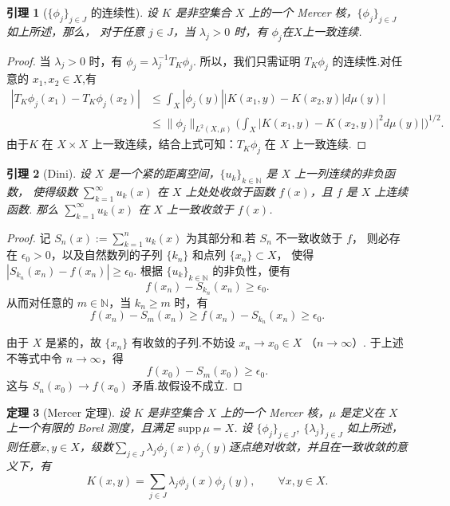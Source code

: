 \documentclass[12pt, a4paper, oneside]{ctexbook}
\newtheorem{theorem}{定理}[section]
\newtheorem{lemma}[theorem]{引理}
\begin{document}
\begin{lemma}[{\(\{\phi_j\}_{j\in J}\) 的连续性}]\label{lemma: phi_j连续性}
设 $K$ 是非空集合 $X$ 上的一个 Mercer 核，$\{\phi_j\}_{j\in J}$ 如上所述，那么，
对于任意 $j\in J$，当 $\lambda_j>0$ 时，有 $\phi_j$在$X$上一致连续.
\end{lemma}

\begin{proof}
    当  $\lambda _{j}> 0$ 时，有 $\phi_j=\lambda_j^{-1}T_{K}\phi_{j}.$ 所以，我们只需证明 $T_K\phi_{j}$ 的连续性.对任意的 $x_1,x_2\in X$,有
$$\begin{aligned}|T_{K}\phi_{j}(x_{1})-T_{K}\phi_{j}(x_{2})|&\leq\int_{X}|\phi_{j}(y)||K(x_{1},y)-K(x_{2},y)|d\mu(y)|\\&\leq\|\phi_j\|_{L^2(X,\mu)}\Big(\int_X|K(x_1,y)-K(x_2,y)|^2d\mu(y)|\Big)^{1/2}.\end{aligned}$$
由于$K$ 在 $X\times X$ 上一致连续，结合上式可知：$T_K\phi_j$ 在 $X$ 上一致连续.
\end{proof}

\begin{lemma}[Dini]\label{lemma:Dini}
设 $X$ 是一个紧的距离空间，$\{u_k\}_{k\in\mathbb{N}}$ 是 $X$ 上一列连续的非负函数，
使得级数 $\sum_{k=1}^\infty u_k(x)$ 在 $X$ 上处处收敛于函数 $f(x)$，且 $f$ 是 $X$ 上连续函数.
那么 $\sum_{k=1}^\infty u_k(x)$ 在 $X$ 上一致收敛于 $f(x)$.
\end{lemma}

\begin{proof}
记 $S_n(x):=\sum_{k=1}^n u_k(x)$ 为其部分和.若 $S_n$ 不一致收敛于 $f$，
则必存在 $\epsilon_0>0$，以及自然数列的子列 $\{k_n\}$ 和点列 $\{x_n\}\subset X$，
使得 $|S_{k_n}(x_n)-f(x_n)|\ge \epsilon_0$.
根据 $\{u_k\}_{k\in\mathbb{N}}$ 的非负性，便有
\[
f(x_n)-S_{k_n}(x_n)\ge \epsilon_0.
\]
从而对任意的 $m\in\mathbb{N}$，当 $k_n\ge m$ 时，有
\[
f(x_n)-S_m(x_n)\ge f(x_n)-S_{k_n}(x_n)\ge \epsilon_0.
\]

由于 $X$ 是紧的，故 $\{x_n\}$ 有收敛的子列.不妨设 $x_n\to x_0\in X$ （$n\to\infty$）.
于上述不等式中令 $n\to\infty$，得
\[
f(x_0)-S_m(x_0)\ge \epsilon_0.
\]
这与 $S_n(x_0)\to f(x_0)$ 矛盾.故假设不成立.
\end{proof}



\begin{theorem}[Mercer 定理]\label{thm:mercer}
设 $K$ 是非空集合 $X$ 上的一个 Mercer 核，$\mu$ 是定义在 $X$ 上一个有限的 Borel 测度，且满足 $\mathrm{supp}\,\mu = X$.
设 $\{\phi_j\}_{j\in J}$, $\{\lambda_j\}_{j\in J}$ 如上所述，则任意$x,y\in X$，级数$\sum_{j\in J} \lambda_j \phi_j(x)\phi_j(y)$逐点绝对收敛，并且在一致收敛的意义下，有
\begin{equation}\label{eq:mercer}
    K(x,y) = \sum_{j\in J} \lambda_j \phi_j(x)\phi_j(y), 
    \qquad \forall x,y \in X.
\end{equation}
\end{theorem}
\end{document}
